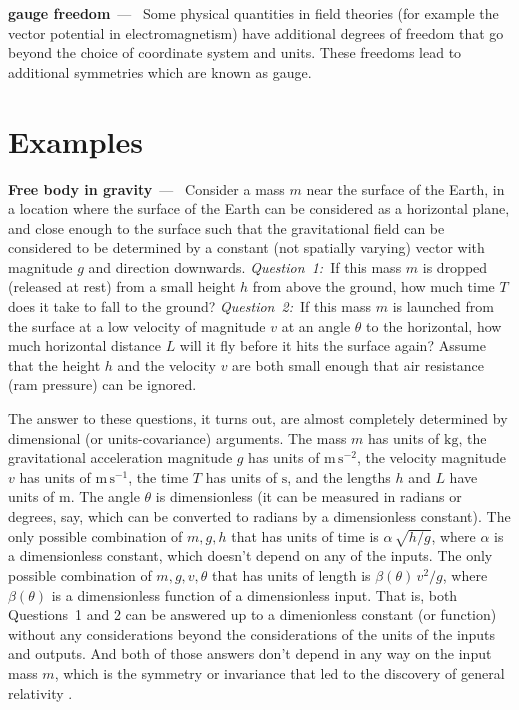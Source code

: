 \documentclass{article}
\newcommand{\unit}[1]{\mathrm{#1}}
\newcommand{\kg}{\unit{kg}}
\newcommand{\m}{\unit{m}}
\newcommand{\s}{\unit{s}}
\renewcommand{\paragraph}[1]{\par\textbf{#1}~---~}
\begin{document}
\paragraph{gauge freedom}
Some physical quantities in field theories (for example the vector potential in electromagnetism) have additional degrees of freedom that go beyond the choice of coordinate system and units.
These freedoms lead to additional symmetries which are known as gauge.

\section{Examples}

\paragraph{Free body in gravity}
Consider a mass $m$ near the surface of the Earth, in a location where the surface of the Earth can be considered as a horizontal plane, and close enough to the surface such that the gravitational field can be considered to be determined by a constant (not spatially varying) vector with magnitude $g$ and direction downwards.
\textsl{Question~1:}~If this mass $m$ is dropped (released at rest) from a small height $h$ from above the ground, how much time $T$ does it take to fall to the ground?
\textsl{Question~2:}~If this mass $m$ is launched from the surface at a low velocity of magnitude $v$ at an angle $\theta$ to the horizontal, how much horizontal distance $L$ will it fly before it hits the surface again?
Assume that the height $h$ and the velocity $v$ are both small enough that air resistance (ram pressure) can be ignored.

The answer to these questions, it turns out, are almost completely determined by dimensional (or units-covariance) arguments.
The mass $m$ has units of $\kg$, the gravitational acceleration magnitude $g$ has units of $\m\,\s^{-2}$, the velocity magnitude $v$ has units of $\m\,\s^{-1}$, the time $T$ has units of $\s$, and the lengths $h$ and $L$ have units of $\m$.
The angle $\theta$ is dimensionless (it can be measured in radians or degrees, say, which can be converted to radians by a dimensionless constant).
The only possible combination of $m, g, h$ that has units of time is $\alpha\,\sqrt{h/g}$, where $\alpha$ is a dimensionless constant, which doesn't depend on any of the inputs.
The only possible combination of $m, g, v, \theta$ that has units of length is $\beta(\theta)\,v^2/g$, where $\beta(\theta)$ is a dimensionless function of a dimensionless input.
That is, both Questions~1 and 2 can be answered up to a dimenionless constant (or function) without any considerations beyond the considerations of the units of the inputs and outputs.
And both of those answers don't depend in any way on the input mass $m$, which is the symmetry or invariance that led to the discovery of general relativity \cite{gr}.
\end{document}
